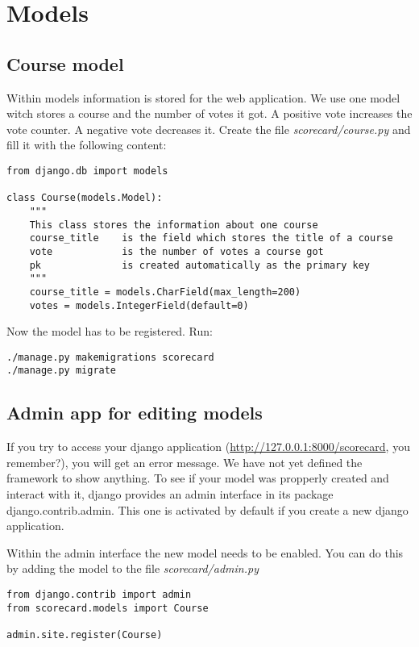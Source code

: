 \section{Models}

\subsection{Course model}
Within models information is stored for the web application. We use one model witch stores a course and the number of votes it got. A positive vote increases the vote counter. A negative vote decreases it. Create the file \emph{scorecard/course.py} and fill it with the following content:

\begin{lstlisting}[style=Python, caption=scorecard/models.py, label=lst:models.py]
from django.db import models

class Course(models.Model):
    """
    This class stores the information about one course
    course_title    is the field which stores the title of a course
    vote            is the number of votes a course got
    pk              is created automatically as the primary key
    """
    course_title = models.CharField(max_length=200)
    votes = models.IntegerField(default=0)
\end{lstlisting}

Now the model has to be registered. Run:
\begin{lstlisting}[style=Bash, caption=Register models, label=lst:register_models]
./manage.py makemigrations scorecard
./manage.py migrate
\end{lstlisting}

\subsection{Admin app for editing models}
If you try to access your django application (\url{http://127.0.0.1:8000/scorecard}, you remember?), you will get an error message. We have not yet defined the framework to show anything. To see if your model was propperly created and interact with it, django provides an admin interface in its package django.contrib.admin. This one is activated by default if you create a new django application.

Within the admin interface the new model needs to be enabled. You can do this by adding the model to the file \emph{scorecard/admin.py}
\begin{lstlisting}[style=Python, caption=scorecard/admin.py, label=lst:admin.py]
from django.contrib import admin
from scorecard.models import Course

admin.site.register(Course)
\end{lstlisting}


